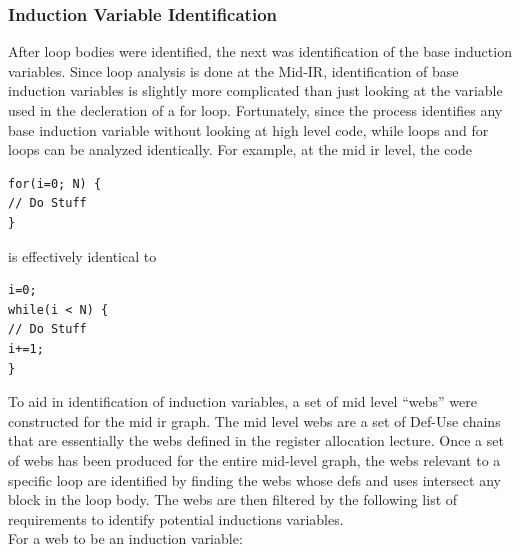 \documentclass[11pt]{article}
\begin{document}
\subsubsection {Induction Variable Identification} 

After loop bodies were identified, the next was identification of the
base induction variables. Since loop analysis is done at the Mid-IR,
identification of base induction variables is slightly more
complicated than just looking at the variable used in the decleration
of a for loop. Fortunately, since the process identifies any base
induction variable without looking at high level code, while loops and
for loops can be analyzed identically. For example, at the mid ir
level, the code 

\begin{verbatim} 
for(i=0; N) { 
// Do Stuff
}
\end{verbatim}

\noindent is effectively identical to 

\begin{verbatim} 
i=0; 
while(i < N) { 
// Do Stuff 
i+=1;
}
\end{verbatim} 

\noindent To aid in identification of induction variables, a set of
mid level ``webs'' were constructed for the mid ir graph. The mid
level webs are a set of Def-Use chains that are essentially the webs
defined in the register allocation lecture. Once a set of webs has
been produced for the entire mid-level graph, the webs relevant to a
specific loop are identified by finding the webs whose defs and uses
intersect any block in the loop body. The webs are then filtered by
the following list of requirements to identify potential inductions
variables.\\ 

\noindent For a web to be an induction variable: 
\end{document}
